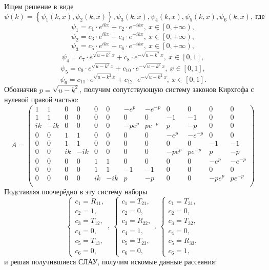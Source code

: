 \documentclass[a4 paper, 12 pt]{extarticle}
\begin{document}
   Ищем решение в виде
   \[\psi\left(k\right) = \left\{\psi_1\left(k,x\right), \psi_2\left(k,x\right)\right\}, \psi_3\left(k,x\right),\psi_4\left(k,x\right),\psi_5\left(k,x\right),\psi_6\left(k,x\right),\ \text{где}\]
   \[\psi_1 = c_1 \cdot e^{ikx} + c_2 \cdot e^{-ikx}, \ x \in \left[0,+\infty\right),\]
   \[\psi_2 = c_3 \cdot e^{ikx} + c_4 \cdot e^{-ikx}, \ x \in \left[0,+\infty\right),\]
   \[\psi_3 = c_5 \cdot e^{ikx} + c_6 \cdot e^{-ikx}, \ x \in \left[0,+\infty\right),\]
   \[\psi_4 = c_7 \cdot e^{\sqrt{u-k^2}x} + c_8 \cdot e^{-\sqrt{u-k^2}x}, \ x \in \left[0, 1\right],\]
   \[\psi_5 = c_9 \cdot e^{\sqrt{u-k^2}x} + c_{10} \cdot e^{-\sqrt{u-k^2}x}, \ x \in \left[0, 1\right],\]
   \[\psi_6 = c_{11} \cdot e^{\sqrt{u-k^2}x} + c_{12} \cdot e^{-\sqrt{u-k^2}x}, \ x \in \left[0, 1\right].\]
   Обозначив $p = \sqrt{u-k^2}$, получим сопутствующую систему законов Кирхгофа с нулевой правой частью:
   \[ A = \left(\begin{smallmatrix}
   1 & 1 & 0 & 0 & 0 & 0 & -e^{p} & -e^{-p} & 0 & 0 & 0 & 0 \\
   1 & 1 & 0 & 0 & 0 & 0 & 0 & 0 & -1 & -1 & 0 & 0 \\
   ik & -ik & 0 & 0 & 0 & 0 & -pe^{p} & pe^{-p} & p & -p & 0 & 0\\
   0 & 0 & 1 & 1 & 0 & 0 & 0 & 0 & -e^{p} & -e^{-p} & 0 & 0 \\
   0 & 0 & 1 & 1 & 0 & 0 & 0 & 0 & 0 & 0 & -1 & -1 \\
   0 & 0 & ik & -ik & 0 & 0 & 0 & 0 & -pe^{p} & pe^{-p} & p & -p \\
   0 & 0 & 0 & 0 & 1 & 1 & 0 & 0 & 0 & 0 & -e^{p} & -e^{-p} \\
   0 & 0 & 0 & 0 & 1 & 1 & -1 & -1 & 0 & 0 & 0 & 0 \\
   0 & 0 & 0 & 0 & ik & -ik & p & -p & 0 & 0 & -pe^{p} & pe^{-p} \\
   \end{smallmatrix}\right)\]
   Подставляя поочерёдно в эту систему наборы 
   \[
   \begin{cases}
   c_1 = R_{11},\\
   c_2 = 1, \\
   c_3 = T_{12}, \\
   c_4 = 0, \\
   c_5 = T_{13}, \\
   c_6 = 0,
   \end{cases}, \ 
   \begin{cases}
   c_1 = T_{21},\\
   c_2 = 0, \\
   c_3 = R_{22}, \\
   c_4 = 1, \\
   c_5 = T_{23}, \\
   c_6 = 0,
   \end{cases}, \
   \begin{cases}
   c_1 = T_{31},\\
   c_2 = 0, \\
   c_3 = T_{32}, \\
   c_4 = 0, \\
   c_5 = R_{33}, \\
   c_6 = 1,
   \end{cases}
   \]
   и решая получившиеся СЛАУ, получим искомые данные рассеяния:
\end{document}
